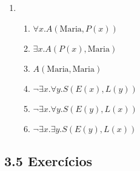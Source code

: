 \begin{enumerate}
		\item
		\begin{enumerate}
			\item $\forall x.A(\text{Maria}, P(x))$
			\item $\exists x.A(P(x), \text{Maria})$
			\item $A(\text{Maria}, \text{Maria})$
			\item $\neg \exists x.\forall y.S(E(x), L(y))$
			\item $\neg \exists x.\forall y.S(E(y), L(x))$
			\item $\neg \exists x.\exists y.S(E(y), L(x))$
		\end{enumerate}
	\end{enumerate}

\subsection{3.5 Exerc\'icios}

